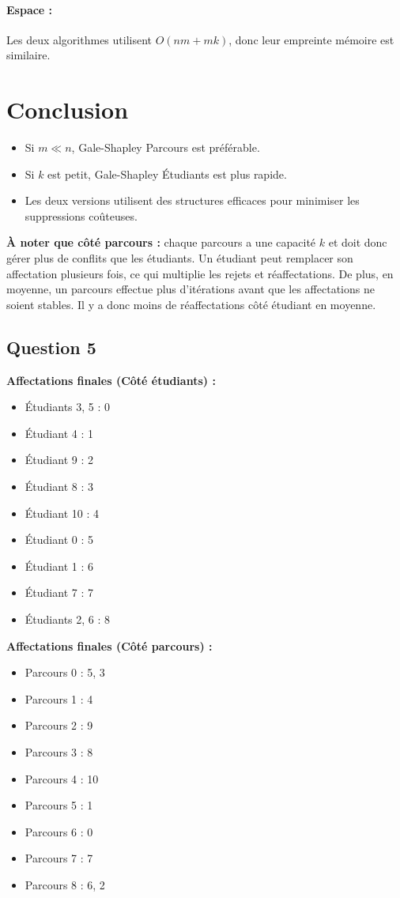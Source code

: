 \documentclass[a4paper,11pt]{article}
\begin{document}
\paragraph{Espace :} Les deux algorithmes utilisent $O(nm + mk)$, donc leur empreinte mémoire est similaire.

\section{Conclusion}
\begin{itemize}
    \item Si $m \ll n$, Gale-Shapley Parcours est préférable.
    \item Si $k$ est petit, Gale-Shapley Étudiants est plus rapide.
    \item Les deux versions utilisent des structures efficaces pour minimiser les suppressions coûteuses.
\end{itemize}

\textbf{À noter que côté parcours :} chaque parcours a une capacité \( k \) et doit donc gérer plus de conflits que les étudiants. Un étudiant peut remplacer son affectation plusieurs fois, ce qui multiplie les rejets et réaffectations. De plus, en moyenne, un parcours effectue plus d'itérations avant que les affectations ne soient stables. Il y a donc moins de réaffectations côté étudiant en moyenne. 


\subsection*{Question 5}

\textbf{Affectations finales (Côté étudiants) :}
\begin{itemize}[label=\textbullet]
\item Étudiants 3, 5 : 0
\item Étudiant 4 : 1
\item Étudiant 9 : 2
\item Étudiant 8 : 3
\item Étudiant 10 : 4
\item Étudiant 0 : 5
\item Étudiant 1 : 6
\item Étudiant 7 : 7
\item Étudiants 2, 6 : 8
\end{itemize}

\textbf{Affectations finales (Côté parcours) :}
\begin{itemize}[label=\textbullet]
\item Parcours 0 : 5, 3
\item Parcours 1 : 4
\item Parcours 2 : 9
\item Parcours 3 : 8
\item Parcours 4 : 10
\item Parcours 5 : 1
\item Parcours 6 : 0
\item Parcours 7 : 7
\item Parcours 8 : 6, 2
\end{itemize}
\end{document}
